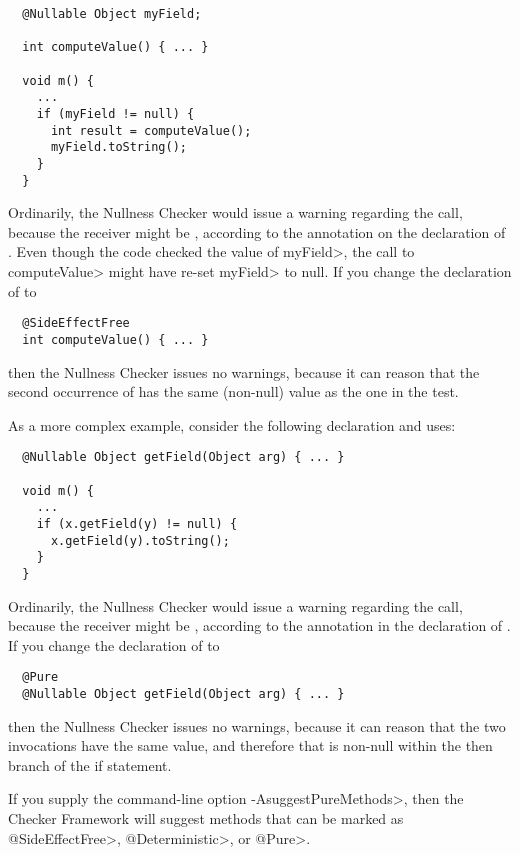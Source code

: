 \begin{Verbatim}
  @Nullable Object myField;

  int computeValue() { ... }

  void m() {
    ...
    if (myField != null) {
      int result = computeValue();
      myField.toString();
    }
  }
\end{Verbatim}

\noindent
Ordinarily, the Nullness Checker would issue a warning regarding the
 call, because the receiver  might be
, according to the  annotation on the
declaration of .  Even though the code checked the value of
\<myField>, the call to \<computeValue> might have re-set \<myField> to null.
If you change the declaration of  to

\begin{Verbatim}
  @SideEffectFree
  int computeValue() { ... }
\end{Verbatim}

\noindent
then the Nullness Checker issues no warnings, because it can reason that
the second occurrence of  has the same (non-null) value as
the one in the test.

As a more complex example, consider the
following declaration and uses:

\begin{Verbatim}
  @Nullable Object getField(Object arg) { ... }

  void m() {
    ...
    if (x.getField(y) != null) {
      x.getField(y).toString();
    }
  }
\end{Verbatim}

Ordinarily, the Nullness Checker would issue a warning regarding the
 call, because the receiver  might
be , according to the  annotation in the
declaration of .  If you change the declaration of
 to

\begin{Verbatim}
  @Pure
  @Nullable Object getField(Object arg) { ... }
\end{Verbatim}

\noindent
then the Nullness Checker issues no warnings, because it can reason that
the two invocations  have the same value, and
therefore that  is non-null within the then branch
of the if statement.


If you supply the command-line option \<-AsuggestPureMethods>, then the
Checker Framework will suggest methods that can be marked as
\<@SideEffectFree>, \<@Deterministic>, or \<@Pure>.

